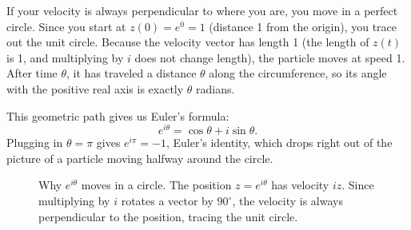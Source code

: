 If your velocity is always perpendicular to where you are, you move in a perfect circle. Since you start at $z(0) = e^0 = 1$ (distance 1 from the origin), you trace out the unit circle. Because the velocity vector has length 1 (the length of $z(t)$ is 1, and multiplying by $i$ does not change length), the particle moves at speed 1. After time $\theta$, it has traveled a distance $\theta$ along the circumference, so its angle with the positive real axis is exactly $\theta$ radians. 

This geometric path gives us Euler's formula:
\[
e^{i\theta} = \cos\theta + i\sin\theta.
\]
Plugging in $\theta = \pi$ gives $e^{i\pi} = -1$, Euler's identity, which drops right out of the picture of a particle moving halfway around the circle.

\begin{figure}[htbp]
\centering
{}
\caption{Why $e^{i\theta}$ moves in a circle. The position $z=e^{i\theta}$ has velocity $i z$. Since multiplying by $i$ rotates a vector by $90^\circ$, the velocity is always perpendicular to the position, tracing the unit circle.}
\label{ch29:fig-euler-velocity}
\end{figure}


